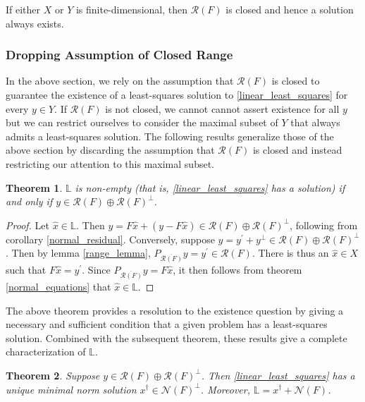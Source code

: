 \documentclass[12pt]{article}
\newcommand{\R}{\mathcal{R}}
\newcommand{\N}{\mathcal{N}}
\newtheorem{thm}{Theorem}
\begin{document}
If either $X$ or $Y$ is finite-dimensional, then $\R(F)$ is closed and hence a solution always exists. 

\subsubsection{Dropping Assumption of Closed Range}

In the above section, we rely on the assumption that $\R(F)$ is closed to guarantee the existence of a least-squares solution
to \eqref{linear_least_squares} for every $y \in Y$. 
If $\R(F)$ is not closed, we cannot cannot assert existence for all $y$  
but we can restrict ourselves to consider the maximal subset of $Y$ that always admits a least-squares solution. 
The following results generalize those of the above section by discarding the assumption that $\R(F)$ is closed and instead 
restricting our attention to this maximal subset. 

\begin{thm} \label{existence_theorem}
$\mathbb{L}$ is non-empty (that is, \eqref{linear_least_squares} has a solution) if and only if $y \in \R(F) \oplus \R(F)^\perp$. 
\end{thm} 

\begin{proof} 
Let $\hat{x} \in \mathbb{L}$. Then $y = F\hat{x} + (y - F\hat{x}) \in \R(F) \oplus \R(F)^\perp$, following from corollary 
\ref{normal_residual}. Conversely, suppose $y = y^\prime + y^\perp \in \R(F) \oplus \R(F)^\perp$. Then by lemma 
\ref{range_lemma}, $P_{\overline{\R(F)}}y = y^\prime \in \R(F)$. There is thus an $\hat{x} \in X$ such that 
$F\hat{x} = y^\prime$. Since $P_{\overline{\R(F)}}y = F\hat{x}$, it then follows from theorem \ref{normal_equations} that 
$\hat{x} \in \mathbb{L}$. 
\end{proof} 

The above theorem provides a resolution to the existence question by giving a necessary and sufficient condition that 
a given problem has a least-squares solution. Combined with the subsequent theorem, these results give a complete
characterization of $\mathbb{L}$. 

\begin{thm} \label{solution_characterization}
Suppose $y \in \R(F) \oplus \R(F)^\perp$. Then \eqref{linear_least_squares} has a unique minimal norm solution $x^\dagger \in \N(F)^\perp$. 
Moreover, $\mathbb{L} = x^\dagger + \N(F)$. 
\end{thm} 
\end{document}
